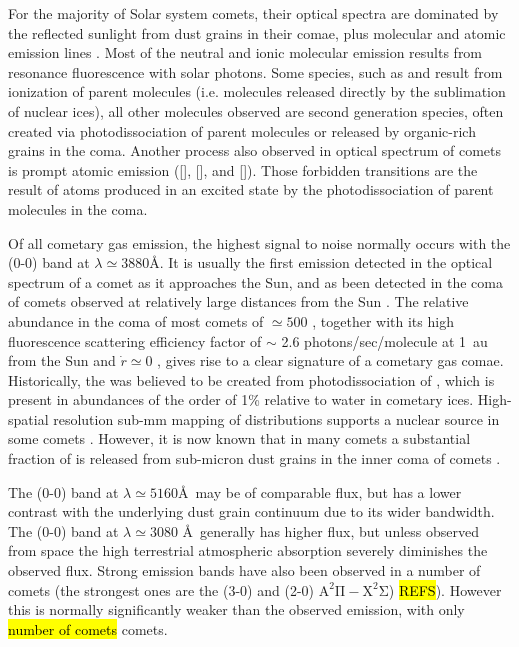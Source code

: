 \documentclass{aa}
\begin{document}
For the majority of Solar system comets, their optical spectra are dominated by the reflected sunlight from dust grains in their comae, plus molecular and atomic emission lines \citep[e.g. ][]{hyland2019}.
%
Most of the neutral and ionic molecular emission results from resonance fluorescence with solar photons. Some species, such as  and  result from ionization of parent molecules (i.e. molecules released directly by the sublimation of nuclear ices), all other molecules observed are second generation species, often created via photodissociation of parent molecules or released by organic-rich grains in the coma.
%
Another process also observed in optical spectrum of comets is prompt atomic emission  ([], [], and []).
%
Those forbidden transitions are the result of atoms produced in an excited state by the photodissociation of parent molecules in the coma. 

Of all cometary gas emission, the highest signal to noise normally occurs with the  (0-0) band at $\lambda\simeq 3880$\AA.
%
It is usually the first emission detected in the optical spectrum of a comet as it approaches the Sun, and as been detected in the coma of comets observed at relatively large distances from the Sun \citep[e.g. ][]{Fitzsimmons1996}.
%
The relative abundance in the coma of most comets of $\simeq500$ \citep{AHearn1995}, together with its high fluorescence scattering efficiency factor of $\sim$ 2.6 photons/sec/molecule at 1~au from the Sun and $\dot{r}\simeq 0$ \citep{Schleicher2010}, gives rise to a clear signature of a cometary gas comae.
%
Historically, the  was believed to be created from photodissociation of , which is present in abundances of the order of 1\% relative to water in cometary ices.
%
High-spatial resolution sub-mm mapping of  distributions supports a nuclear source in some comets \citep{Cordiner2014}.
%
However, it is now known that in many comets a substantial fraction of  is released from sub-micron dust grains in the inner coma of comets \citep[e.g. ][]{Fray2005}. 

The  (0-0) band at $\lambda\simeq 5160$\AA \ may be of comparable flux, but has a lower contrast with the underlying dust grain continuum due to its wider bandwidth.
%
The  (0-0) band at $\lambda\simeq 3080$ \AA \ generally has higher flux, but unless observed from space the high terrestrial atmospheric absorption severely diminishes the observed flux.
%
Strong  emission bands have also been observed in a number of comets (the strongest ones are the (3-0) and (2-0) $\mathrm{A^2\Pi-X^2\Sigma}$) \hl{REFS}).
%
However this is normally significantly weaker than the observed  emission, with only \hl{number of comets} comets.
\end{document}
